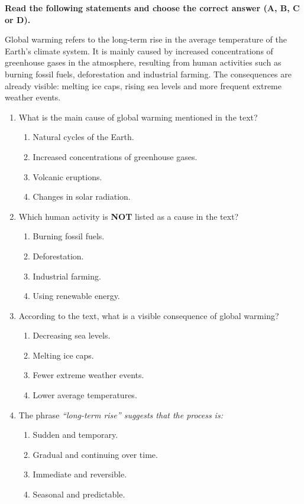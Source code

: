 \documentclass[11pt]{article}
\newcommand{\eng}[1]{\ifmmode\text{\textit{#1}}\else\begingroup\selectlanguage{english}\itshape #1\endgroup\fi}
\begin{document}
\begin{exercice}
\textbf{Read the following statements and choose the correct answer (A, B, C or D).}
\begin{textebox}
Global warming refers to the long-term rise in the average temperature of the Earth's climate system. It is mainly caused by increased concentrations of greenhouse gases in the atmosphere, resulting from human activities such as burning fossil fuels, deforestation and industrial farming. The consequences are already visible: melting ice caps, rising sea levels and more frequent extreme weather events.
\end{textebox}
\begin{enumerate}
\item What is the main cause of global warming mentioned in the text?
      \begin{enumerate}
      \item Natural cycles of the Earth.
      \item Increased concentrations of greenhouse gases.
      \item Volcanic eruptions.
      \item Changes in solar radiation.
      \end{enumerate}
\item Which human activity is \textbf{NOT} listed as a cause in the text?
      \begin{enumerate}
      \item Burning fossil fuels.
      \item Deforestation.
      \item Industrial farming.
      \item Using renewable energy.
      \end{enumerate}
\item According to the text, what is a visible consequence of global warming?
      \begin{enumerate}
      \item Decreasing sea levels.
      \item Melting ice caps.
      \item Fewer extreme weather events.
      \item Lower average temperatures.
      \end{enumerate}
\item The phrase \eng{“long-term rise”} suggests that the process is:
      \begin{enumerate}
      \item Sudden and temporary.
      \item Gradual and continuing over time.
      \item Immediate and reversible.
      \item Seasonal and predictable.
      \end{enumerate}
\end{enumerate}
\end{exercice}
\end{document}
